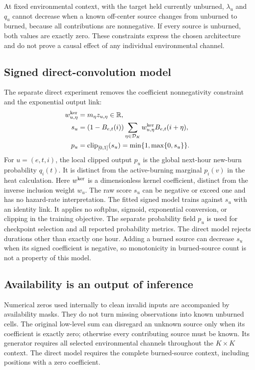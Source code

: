\documentclass[11pt,a4paper]{article}
\newcommand{\R}{\mathbb{R}}
\begin{document}
At fixed environmental context, with the target held currently unburned,
$\lambda_u$ and $q_u$ cannot decrease when a known off-center source changes
from unburned to burned, because all contributions are nonnegative. If every source is unburned, both values are exactly zero.
These constraints express the chosen architecture and do not prove a causal
effect of any individual environmental channel.

\subsection{Signed direct-convolution model}

The separate direct experiment removes the coefficient nonnegativity
constraint and the exponential output link:
\begin{align}
 w^{\rm ker}_{u,\eta}&=m_\eta z_{u,\eta}\in\R,\\
 s_u&=(1-B_{e,t}(i))\sum_{\eta\in\mathcal D_K}
                  w^{\rm ker}_{u,\eta}B_{e,t}(i+\eta),\\
 p_u&=\operatorname{clip}_{[0,1]}(s_u)
        =\min\{1,\max\{0,s_u\}\}.
 \label{eq:prob-direct}
\end{align}
For $u=(e,t,i)$, the local clipped output $p_u$ is the global next-hour
new-burn probability $q_i(t)$. It is distinct from the active-burning
marginal $p_i(v)$ in the heat calculation.
Here $w^{\rm ker}$ is a dimensionless kernel coefficient, distinct from the
inverse inclusion weight $w_u$. The raw score $s_u$ can be negative or exceed
one and has no hazard-rate interpretation. The fitted signed model trains
against $s_u$ with an identity link. It applies no softplus, sigmoid,
exponential conversion, or clipping in the training objective. The separate
probability field $p_u$ is used for checkpoint selection and all reported
probability metrics. The direct model rejects durations other than exactly
one hour. Adding a burned source can decrease $s_u$ when its signed
coefficient is negative, so monotonicity in burned-source count is not a
property of this model.

\subsection{Availability is an output of inference}

Numerical zeros used internally to clean invalid inputs are accompanied by
availability masks. They do not turn missing observations into known
unburned cells. The original low-level sum can disregard an unknown source
only when its coefficient is exactly zero; otherwise every contributing
source must be known. Its generator requires all selected environmental
channels throughout the $K\times K$ context. The direct model requires the
complete burned-source context, including positions with a zero coefficient.
\end{document}
